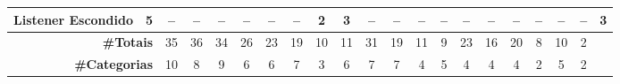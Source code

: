 \begin{table*}[t]
\begin{tabular}{@{}p{3.8cm}p{0.3cm}p{.2cm}p{.2cm}p{.2cm}p{.2cm}p{.2cm}p{.2cm}p{.2cm}p{.2cm}p{.2cm}p{.4cm}p{.4cm}p{.4cm}p{.4cm}p{.4cm}p{.4cm}p{.4cm}p{.4cm}p{.4cm}p{0.2cm}@{}}
Listener Escondido				& \multicolumn{1}{c}{5}  	& \multicolumn{1}{c}{--}  	& \multicolumn{1}{c}{--}  	& \multicolumn{1}{c}{--} 	& \multicolumn{1}{c}{--} 	& \multicolumn{1}{c}{--} 	& \multicolumn{1}{c}{--} 	& \multicolumn{1}{c}{2} 	& \multicolumn{1}{c}{3} 	& \multicolumn{1}{c}{--} 	& \multicolumn{1}{c}{--} 	& \multicolumn{1}{c}{--} 	& \multicolumn{1}{c}{--} 	& \multicolumn{1}{c}{--} 	& \multicolumn{1}{c}{--} 	& \multicolumn{1}{c}{--} 	& \multicolumn{1}{c}{--} 	& \multicolumn{1}{c}{--} 	& \multicolumn{1}{c}{--} 	& \multicolumn{1}{c}{3} \\
\hline
\multicolumn{2}{r}{\textbf{\#Totais}} 		& \multicolumn{1}{c}{35} & \multicolumn{1}{c}{36} & \multicolumn{1}{c}{34} & \multicolumn{1}{c}{26} & \multicolumn{1}{c}{23} & \multicolumn{1}{c}{19} & \multicolumn{1}{c}{10} & \multicolumn{1}{c}{11} & \multicolumn{1}{c}{31} & \multicolumn{1}{c}{19} & \multicolumn{1}{c}{11} & \multicolumn{1}{c}{9} & \multicolumn{1}{c}{23} & \multicolumn{1}{c}{16} & \multicolumn{1}{c}{20} & \multicolumn{1}{c}{8} & \multicolumn{1}{c}{10} & \multicolumn{1}{c}{2} \\
\hline
\multicolumn{2}{r}{\textbf{\#Categorias}} 	& \multicolumn{1}{c}{10} & \multicolumn{1}{c}{8} & \multicolumn{1}{c}{9} & \multicolumn{1}{c}{6} & \multicolumn{1}{c}{6} & \multicolumn{1}{c}{7} & \multicolumn{1}{c}{3} & \multicolumn{1}{c}{6} & \multicolumn{1}{c}{7} & \multicolumn{1}{c}{7} & \multicolumn{1}{c}{4} & \multicolumn{1}{c}{5} & \multicolumn{1}{c}{4} & \multicolumn{1}{c}{4} & \multicolumn{1}{c}{4} & \multicolumn{1}{c}{2} & \multicolumn{1}{c}{5} & \multicolumn{1}{c}{2} \\
\hline


\end{tabular}
\end{table*}
